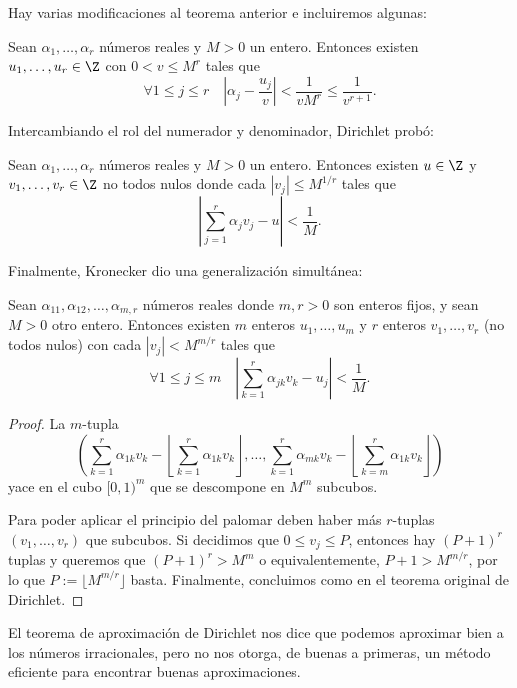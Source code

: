 \documentclass[teoria-numeros.tex]{subfiles}
\begin{document}
Hay varias modificaciones al teorema anterior e incluiremos algunas:
\begin{prop}
	Sean $\alpha_1, \dots, \alpha_r$ números reales y $M > 0$ un entero.
	Entonces existen $u_1, \dots, u_r \in \Z$ con $0 < v \le M^r$ tales que
	$$ \forall 1 \le j \le r \quad \left| \alpha_j - \frac{u_j}{v} \right| < \frac{1}{vM^r} \le \frac{1}{v^{r+1}}. $$
\end{prop}
Intercambiando el rol del numerador y denominador, Dirichlet probó:
\begin{prop}
	Sean $\alpha_1, \dots, \alpha_r$ números reales y $M > 0$ un entero.
	Entonces existen $u \in \Z$ y $v_1, \dots, v_r \in \Z$ no todos nulos donde cada $|v_j| \le M^{1/r}$ tales que
	$$ \left| \sum_{j=1}^{r} \alpha_jv_j - u \right| < \frac{1}{M}. $$
\end{prop}

Finalmente, Kronecker dio una generalización simultánea:
\begin{thm}
	Sean $\alpha_{11}, \alpha_{12}, \dots, \alpha_{m,r}$ números reales donde $m, r > 0$ son enteros fijos, y sean $M > 0$ otro entero.
	Entonces existen $m$ enteros $u_1, \dots, u_m$ y $r$ enteros $v_1, \dots, v_r$ (no todos nulos) con cada $|v_j| < M^{m/r}$
	tales que
	$$ \forall 1 \le j \le m \quad \left| \sum_{k=1}^{r} \alpha_{jk} v_k - u_j \right| < \frac{1}{M}. $$
\end{thm}
\begin{proof}
	La $m$-tupla
	$$ \left( \sum_{k=1}^{r} \alpha_{1k}v_k - \left\lfloor \sum_{k=1}^{r} \alpha_{1k}v_k \right\rfloor, \dots, \sum_{k=1}^{r} \alpha_{mk}v_k - \left\lfloor \sum_{k=m}^{r} \alpha_{1k}v_k \right\rfloor \right) $$
	yace en el cubo $[0, 1)^m$ que se descompone en $M^m$ subcubos.

	Para poder aplicar el principio del palomar deben haber más $r$-tuplas $(v_1, \dots, v_r)$ que subcubos.
	Si decidimos que $0 \le v_j \le P$, entonces hay $(P+1)^r$ tuplas y queremos que $(P+1)^r > M^m$ o equivalentemente, $P + 1 > M^{m/r}$,
	por lo que $P := \lfloor M^{m/r} \rfloor$ basta.
	Finalmente, concluimos como en el teorema original de Dirichlet.
\end{proof}

El teorema de aproximación de Dirichlet nos dice que podemos aproximar bien a los números irracionales, pero no nos otorga, de buenas a primeras,
un método eficiente para encontrar buenas aproximaciones.
\end{document}
